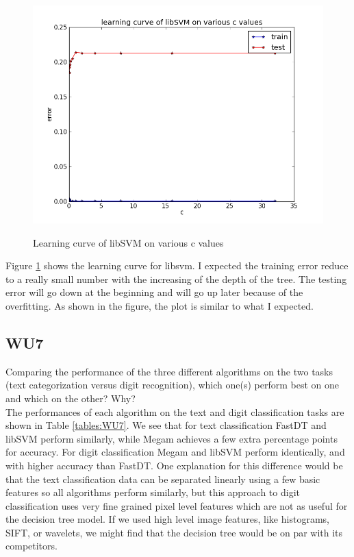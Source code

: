 \documentclass[a4paper,11pt]{article}
\begin{document}
\begin{figure}[!ht]
  \begin{center}
  \caption{Learning curve of libSVM on various c values}
  \includegraphics[width=4.5in]{WU6/learningCurve_libsvm.png}
  \label{figures:wu63}
  \end{center}
\end{figure}

Figure \ref{figures:wu63} shows the learning curve for libsvm.  
I expected the training error reduce to a really small number with
the increasing of the depth of the tree. The testing error will go 
down at the beginning and will go up later because of the overfitting. 
As shown in the figure, the plot is similar to what I expected.


\subsection{WU7}
\textsf{Comparing the performance of the three different algorithms 
on the two tasks (text categorization versus digit recognition), 
which one(s) perform best on one and which on the other? Why?}\\

The performances of each algorithm on the text and digit classification 
tasks are shown in Table \ref{tables:WU7}. We see that for text 
classification FastDT and libSVM perform similarly, while Megam achieves a 
few extra percentage points for accuracy. For digit classification Megam and 
libSVM perform identically, and with higher accuracy than FastDT. One 
explanation for this difference would be that the text classification data 
can be separated linearly using a few basic features so all algorithms 
perform similarly, but this approach to digit classification uses very fine 
grained pixel level features which are not as useful for the decision tree 
model. If we used high level image features, like histograms, SIFT, or 
wavelets, we might find that the decision tree would be on par with
its competitors.
\end{document}

